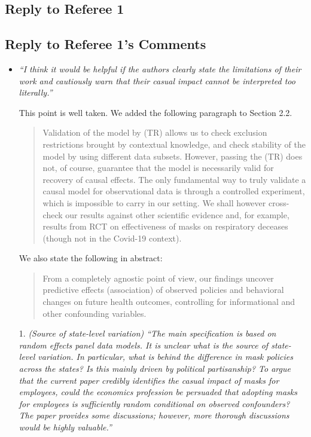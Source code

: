 \documentclass[11pt]{article}
\begin{document}
\newpage

\replytitle
\subsection*{Reply to Referee 1}

\changes
\subsection*{Reply to Referee 1's Comments}
\begin{itemize}

\item  \textit{``I think it would be helpful if the authors clearly state the limitations of their work and
cautiously warn that their casual impact cannot be interpreted too literally.''}
 
 This point is well taken. We added the following paragraph to Section 2.2. 
 \begin{quote}
 Validation of the model by (TR) allows us to check exclusion restrictions brought by contextual knowledge, and check stability of the model by using different data subsets. However, passing the (TR) does not, of course, guarantee that the model is necessarily valid for recovery of causal effects. The only fundamental way to truly validate a causal model for observational data is through a controlled experiment, which is impossible to carry in our setting. We shall however cross-check our results against other scientific evidence and, for example, results from RCT on effectiveness of masks on respiratory deceases (though not in the Covid-19 context).
 \end{quote}
 
 We also state the following in abstract:
 \begin{quote}
 From a completely agnostic point of view,
our findings uncover predictive effects (association) of observed policies and behavioral changes  on future health outcomes,
 controlling for informational and other confounding variables.
\end{quote}
  
\item[1.]   \textit{(Source of state-level variation) ``The main specification is based on random effects panel data
models. It is unclear what is the source of state-level variation. In particular, what is behind
the difference in mask policies across the states? Is this mainly driven by political partisanship?
To argue that the current paper credibly identifies the casual impact of masks for
employees, could the economics profession be persuaded that adopting masks for employees
is sufficiently random conditional on observed confounders? The paper provides some
discussions; however, more thorough discussions would be highly valuable.''}
  

\end{itemize}
\end{document}
